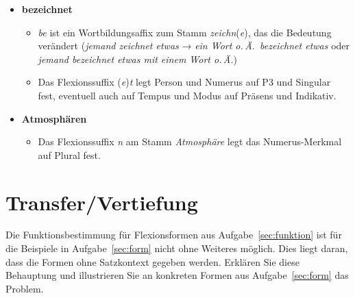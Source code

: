 \documentclass[12pt,a4paper,twoside]{article}
\begin{document}
\begin{itemize}
  \item \textbf{bezeichnet} 
    \begin{itemize}
      \item \textit{be} ist ein Wortbildungsaffix zum Stamm \textit{zeichn}(\textit{e}), das die Bedeutung verändert (\textit{jemand zeichnet etwas} → \textit{ein Wort o.\,Ä.\ bezeichnet etwas} oder \textit{jemand bezeichnet etwas mit einem Wort o.\,Ä.})
      \item Das Flexionssuffix (\textit{e})\textit{t} legt Person und Numerus auf P3 und Singular fest, eventuell auch auf Tempus und Modus auf Präsens und Indikativ.
    \end{itemize}
  \item \textbf{Atmosphären}
    \begin{itemize}
      \item Das Flexionssuffix \textit{n} am Stamm \textit{Atmosphäre} legt das Numerus-Merkmal auf Plural fest.
    \end{itemize}
\end{itemize}

\section{Transfer\slash Vertiefung}

Die Funktionsbestimmung für Flexionsformen aus Aufgabe~\ref{sec:funktion} ist für die Beispiele in Aufgabe~\ref{sec:form} nicht ohne Weiteres möglich.
Dies liegt daran, dass die Formen ohne Satzkontext gegeben werden.
Erklären Sie diese Behauptung und illustrieren Sie an konkreten Formen aus Aufgabe~\ref{sec:form} das Problem.
\end{document}
